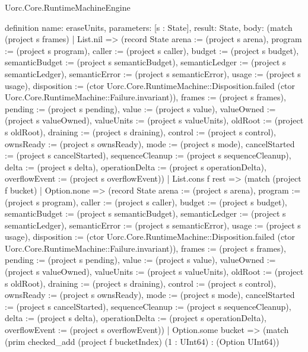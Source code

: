 \begin{lexlean}{Uorc.Core.RuntimeMachineEngine}
\begin{semanticmodule}
definition{
  name: eraseUnits,
  parameters: [s : State],
  result: State,
  body: (match (project s frames)
    | List.nil => (record State {arena := (project s arena), program := (project s program), caller := (project s caller), budget := (project s budget), semanticBudget := (project s semanticBudget), semanticLedger := (project s semanticLedger), semanticError := (project s semanticError), usage := (project s usage), disposition := (ctor Uorc.Core.RuntimeMachine::Disposition.failed (ctor Uorc.Core.RuntimeMachine::Failure.invariant)), frames := (project s frames), pending := (project s pending), value := (project s value), valueOwned := (project s valueOwned), valueUnits := (project s valueUnits), oldRoot := (project s oldRoot), draining := (project s draining), control := (project s control), ownsReady := (project s ownsReady), mode := (project s mode), cancelStarted := (project s cancelStarted), sequenceCleanup := (project s sequenceCleanup), delta := (project s delta), operationDelta := (project s operationDelta), overflowEvent := (project s overflowEvent)})
    | List.cons f rest => (match (project f bucket)
      | Option.none => (record State {arena := (project s arena), program := (project s program), caller := (project s caller), budget := (project s budget), semanticBudget := (project s semanticBudget), semanticLedger := (project s semanticLedger), semanticError := (project s semanticError), usage := (project s usage), disposition := (ctor Uorc.Core.RuntimeMachine::Disposition.failed (ctor Uorc.Core.RuntimeMachine::Failure.invariant)), frames := (project s frames), pending := (project s pending), value := (project s value), valueOwned := (project s valueOwned), valueUnits := (project s valueUnits), oldRoot := (project s oldRoot), draining := (project s draining), control := (project s control), ownsReady := (project s ownsReady), mode := (project s mode), cancelStarted := (project s cancelStarted), sequenceCleanup := (project s sequenceCleanup), delta := (project s delta), operationDelta := (project s operationDelta), overflowEvent := (project s overflowEvent)})
      | Option.some bucket => (match (prim checked_add (project f bucketIndex) (1 : UInt64) : (Option UInt64))
}
\end{semanticmodule}
\end{lexlean}
